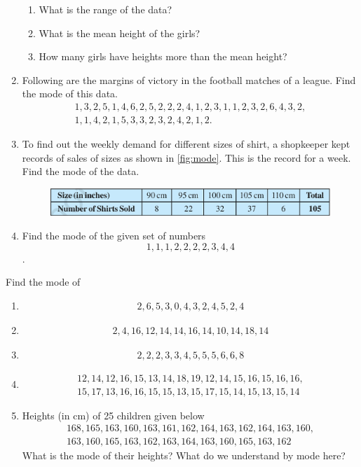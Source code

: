 \begin{enumerate}[label=\thesection.\arabic*, ref=\thesection.\theenumi]
\begin{enumerate}
		\item What is the range of the data?
		\item What is the mean height of the girls?
		\item How many girls have heights more than the mean height?
	\end{enumerate}
\item Following are the margins of victory in the football matches of a league.  Find the mode of this data.
	\begin{gather*}
	1,3,2,5,1,4,6,2,5,2,2,2,4,1,2,3,1,1,2,3,2,6,4,3,2,
	\\
	1,1,4,2,1,5,3,3,2,3,2,4,2,1,2.
	\end{gather*}
	\solution

\item To find out the weekly demand for different sizes of shirt, a shopkeeper kept records of sales of sizes as shown in 
  \eqref{fig:mode}.  This is the record for a week.  Find the mode of the data.
	\begin{figure}[H]
  \centering
  \includegraphics[width=\columnwidth]{figs/mode.jpg}
  \caption{}
  \label{fig:mode}
\end{figure}
\item Find the mode of the given set of numbers
	$$1,1,1,2,2,2,2,3,4,4$$.
\end{enumerate}
Find the mode of
\begin{enumerate}[label=\thesection.\arabic*, ref=\thesection.\theenumi,resume*]
\item 	
		\begin{gather*}
		2,6,5,3,0,4,3,2,4,5,2,4
	\end{gather*}
\item 
		\begin{gather*}
		2,4,16,12,14,14,16,14,10,14,18,14
	\end{gather*}
	\item 
		\begin{gather*}
		2,2,2,3,3,4,5,5,5,6,6,8
	\end{gather*}
	\item 
		\begin{gather*}
		12, 14, 12, 16, 15, 13, 14, 18, 19, 12, 14, 15, 16, 15, 16, 16,
	\\
		15, 17, 13, 16, 16, 15, 15, 13, 15, 17, 15, 14, 15, 13, 15, 14
		\end{gather*}
	\item Heights (in cm) of 25 children given below
		\begin{gather*}
		168, 165, 163, 160, 163, 161, 162, 164, 163, 162,
164, 163,	160, 
		\\
	 163, 160, 165, 163, 162, 163, 164, 163, 160, 165, 163, 162 
	\end{gather*}
		What is the mode of their heights? What do we understand by mode here?
\end{enumerate}
